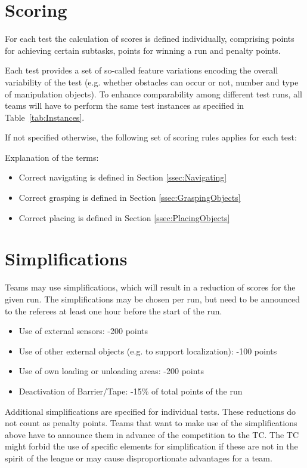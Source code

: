 \section{Scoring} \label{sec:ScoringAndRanking}

For each test the calculation of scores is defined individually, comprising points for achieving certain subtasks,
points for winning a run and penalty points.
\par
Each test provides a set of so-called feature variations encoding the overall variability of the test (e.g. whether
obstacles can occur or not, number and type of manipulation objects). To enhance comparability among different test
runs, all teams will have to perform the same test instances as specified in Table~\ref{tab:Instances}.
\par
If not specified otherwise, the following set of scoring rules applies for each test:


Explanation of the terms:
\begin{itemize}
\item Correct navigating is defined in Section \ref{ssec:Navigating}
\item Correct grasping is defined in Section \ref{ssec:GraspingObjects}
\item Correct placing is defined in Section \ref{ssec:PlacingObjects}
\end{itemize}

\section{Simplifications}
Teams may use simplifications, which will result in a reduction of scores for the given run. The simplifications may be
chosen per run, but need to be announced to the referees at least one hour before the start of the run.

\begin{itemize}
	\item Use of external sensors: \hfill -200 points
	\item Use of other external objects (e.g. to support localization): \hfill -100 points
	\item Use of own loading or unloading areas: \hfill -200 points
  \item Deactivation of Barrier/Tape: -15\% of total points of the run
\end{itemize}

Additional simplifications are specified for individual tests. These reductions do not count as penalty points. Teams
that want to make use of the simplifications above have to announce them in advance of the competition to the TC. The
TC might forbid the use of specific elements for simplification if these are not in the spirit of the league or may
cause disproportionate advantages for a team.

